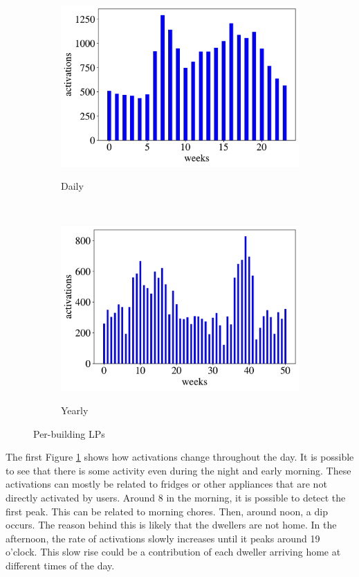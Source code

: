 \begin{figure}[H]
	\begin{subfigure}{.5\textwidth}
		\caption{Daily}
		\includegraphics[width=1\linewidth]{../Figures/LPS/SLPdaily2.pdf}
		\label{fig:SLPdaily2}
	\end{subfigure}%
	~ 
	\begin{subfigure}{.5\textwidth}
		\caption{Yearly}
		\includegraphics[width=1\linewidth]{../Figures/LPS/SLPyearly2.pdf}
		\label{fig:SLPyearly2}
	\end{subfigure}%
	\label{fig:SLP}
	\caption{Per-building LPs}
\end{figure}

The first Figure \ref{fig:SLPdaily2} shows how activations change throughout the day.
It is possible to see that there is some activity even during the night and early morning.
These activations can mostly be related to fridges or other appliances that are not directly activated by users.
Around 8 in the morning, it is possible to detect the first peak. 
This can be related to morning chores. 
Then, around noon, a dip occurs. 
The reason behind this is likely that the dwellers are not home.
In the afternoon, the rate of activations slowly increases until it peaks around 19 o'clock. 
This slow rise could be a contribution of each dweller arriving home at different times of the day.

